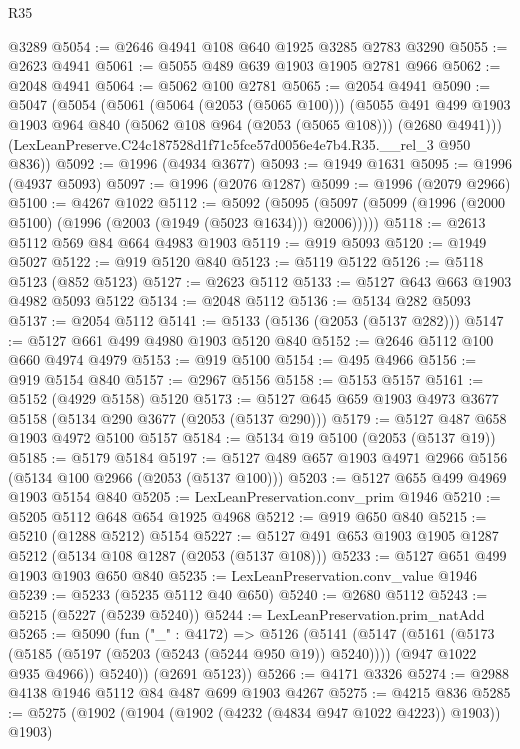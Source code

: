 \begin{lexlean}{R35}
\begin{coremodule}
    @3289
@5054 := @2646 @4941 @108 @640 @1925 @3285 @2783 @3290
@5055 := @2623 @4941
@5061 := @5055 @489 @639 @1903 @1905 @2781 @966
@5062 := @2048 @4941
@5064 := @5062 @100 @2781
@5065 := @2054 @4941
@5090 := @5047
    (@5054
      (@5061
        (@5064 (@2053 (@5065 @100)))
        (@5055
          @491
          @499
          @1903
          @1903
          @964
          @840
          (@5062 @108 @964 (@2053 (@5065 @108)))
          (@2680 @4941)))
      (LexLeanPreserve.C24c187528d1f71c5fce57d0056e4e7b4.R35.__rel_3 @950 @836))
@5092 := @1996 (@4934 @3677)
@5093 := @1949 @1631
@5095 := @1996 (@4937 @5093)
@5097 := @1996 (@2076 @1287)
@5099 := @1996 (@2079 @2966)
@5100 := @4267 @1022
@5112 := @5092
    (@5095 (@5097 (@5099 (@1996 (@2000 @5100) (@1996 (@2003 (@1949 (@5023 @1634))) @2006)))))
@5118 := @2613 @5112 @569 @84 @664 @4983 @1903
@5119 := @919 @5093
@5120 := @1949 @5027
@5122 := @919 @5120 @840
@5123 := @5119 @5122
@5126 := @5118 @5123 (@852 @5123)
@5127 := @2623 @5112
@5133 := @5127 @643 @663 @1903 @4982 @5093 @5122
@5134 := @2048 @5112
@5136 := @5134 @282 @5093
@5137 := @2054 @5112
@5141 := @5133 (@5136 (@2053 (@5137 @282)))
@5147 := @5127 @661 @499 @4980 @1903 @5120 @840
@5152 := @2646 @5112 @100 @660 @4974 @4979
@5153 := @919 @5100
@5154 := @495 @4966
@5156 := @919 @5154 @840
@5157 := @2967 @5156
@5158 := @5153 @5157
@5161 := @5152 (@4929 @5158) @5120
@5173 := @5127 @645 @659 @1903 @4973 @3677 @5158 (@5134 @290 @3677 (@2053 (@5137 @290)))
@5179 := @5127 @487 @658 @1903 @4972 @5100 @5157
@5184 := @5134 @19 @5100 (@2053 (@5137 @19))
@5185 := @5179 @5184
@5197 := @5127 @489 @657 @1903 @4971 @2966 @5156 (@5134 @100 @2966 (@2053 (@5137 @100)))
@5203 := @5127 @655 @499 @4969 @1903 @5154 @840
@5205 := LexLeanPreservation.conv_prim @1946
@5210 := @5205 @5112 @648 @654 @1925 @4968
@5212 := @919 @650 @840
@5215 := @5210 (@1288 @5212) @5154
@5227 := @5127 @491 @653 @1903 @1905 @1287 @5212 (@5134 @108 @1287 (@2053 (@5137 @108)))
@5233 := @5127 @651 @499 @1903 @1903 @650 @840
@5235 := LexLeanPreservation.conv_value @1946
@5239 := @5233 (@5235 @5112 @40 @650)
@5240 := @2680 @5112
@5243 := @5215 (@5227 (@5239 @5240))
@5244 := LexLeanPreservation.prim_natAdd
@5265 := @5090
    (fun ("_" : @4172) =>
    @5126
      (@5141
        (@5147
          (@5161
            (@5173 (@5185 (@5197 (@5203 (@5243 (@5244 @950 @19)) @5240))))
            (@947 @1022 @935 @4966))
          @5240))
      (@2691 @5123))
@5266 := @4171 @3326
@5274 := @2988 @4138 @1946 @5112 @84 @487 @699 @1903 @4267
@5275 := @4215 @836
@5285 := @5275 (@1902 (@1904 (@1902 (@4232 (@4834 @947 @1022 @4223)) @1903)) @1903)

\end{coremodule}
\end{lexlean}
